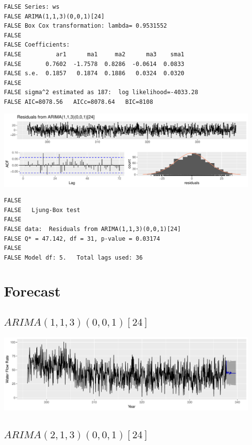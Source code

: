 \documentclass[openany]{book}
\begin{document}
\begin{verbatim}
FALSE Series: ws 
FALSE ARIMA(1,1,3)(0,0,1)[24] 
FALSE Box Cox transformation: lambda= 0.9531552 
FALSE 
FALSE Coefficients:
FALSE          ar1      ma1     ma2      ma3    sma1
FALSE       0.7602  -1.7578  0.8286  -0.0614  0.0833
FALSE s.e.  0.1857   0.1874  0.1886   0.0324  0.0320
FALSE 
FALSE sigma^2 estimated as 187:  log likelihood=-4033.28
FALSE AIC=8078.56   AICc=8078.64   BIC=8108
\end{verbatim}

\includegraphics{Group2_Project1_Fall2019_files/figure-latex/unnamed-chunk-24-1.pdf}

\begin{verbatim}
FALSE 
FALSE   Ljung-Box test
FALSE 
FALSE data:  Residuals from ARIMA(1,1,3)(0,0,1)[24]
FALSE Q* = 47.142, df = 31, p-value = 0.03174
FALSE 
FALSE Model df: 5.   Total lags used: 36
\end{verbatim}

\hypertarget{forecast-2}{%
\section{Forecast}\label{forecast-2}}

\hypertarget{arima11300124}{%
\subsection{\texorpdfstring{\(ARIMA(1,1,3)(0,0,1)[24]\)}{ARIMA(1,1,3)(0,0,1){[}24{]}}}\label{arima11300124}}

\includegraphics{Group2_Project1_Fall2019_files/figure-latex/unnamed-chunk-25-1.pdf}

\hypertarget{arima21300124}{%
\subsection{\texorpdfstring{\(ARIMA(2,1,3)(0,0,1)[24]\)}{ARIMA(2,1,3)(0,0,1){[}24{]}}}\label{arima21300124}}
\end{document}

